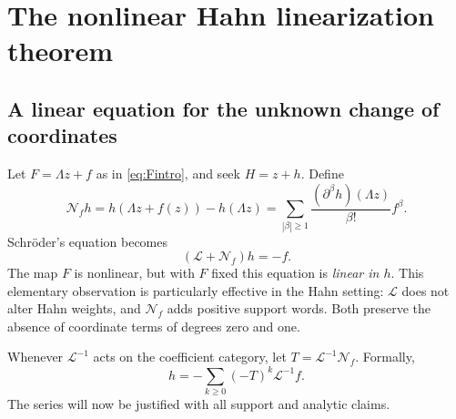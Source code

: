 \documentclass[11pt,letterpaper]{article}
\theoremstyle{definition}
\theoremstyle{remark}
\newcommand{\Li}{\mathcal L}
\newcommand{\NN}{\mathcal N}
\numberwithin{equation}{section}
\begin{document}
\section{The nonlinear Hahn linearization theorem}\label{sec:linearization}

\subsection{A linear equation for the unknown change of coordinates}
Let $F=\Lambda z+f$ as in \eqref{eq:Fintro}, and seek $H=z+h$. Define
\begin{equation}\label{eq:Noperator}
 \NN_f h=h(\Lambda z+f(z))-h(\Lambda z)
       =\sum_{|\beta|\ge1}\frac{(\partial^\beta h)(\Lambda z)}{\beta!}f^\beta.
\end{equation}
Schr\"oder's equation becomes
\begin{equation}\label{eq:linear-Schroeder}
 (\Li+\NN_f)h=-f.
\end{equation}
The map $F$ is nonlinear, but with $F$ fixed this equation is \emph{linear in
$h$}. This elementary observation is particularly effective in the Hahn
setting: $\Li$ does not alter Hahn weights, and $\NN_f$ adds positive
support words. Both preserve the absence of coordinate terms of degrees
zero and one.

Whenever $\Li^{-1}$ acts on the coefficient category, let
$T=\Li^{-1}\NN_f$. Formally,
\begin{equation}\label{eq:linearizer-series}
 \boxed{\displaystyle
 h=-\sum_{k\ge0}(-T)^k\Li^{-1}f.}
\end{equation}
The series will now be justified with all support and analytic claims.
\end{document}
